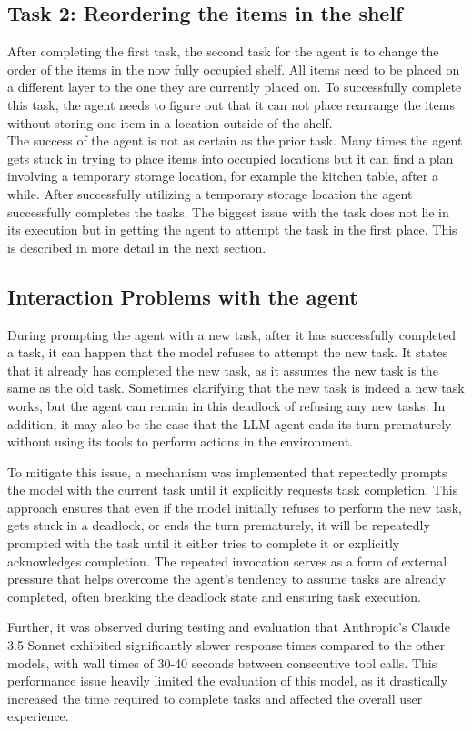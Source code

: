 \documentclass[../report.tex]{subfiles}
\begin{document}
\subsection{Task 2: Reordering the items in the shelf}
After completing the first task, the second task for the agent is to change the order of the items in the now fully occupied shelf. All items need to be placed on a different layer to the one they are currently placed on. To successfully complete this task, the agent needs to figure out that it can not place rearrange the items without storing one item in a location outside of the shelf. \\
The success of the agent is not as certain as the prior task. Many times the agent gets stuck in trying to place items into occupied locations but it can find a plan involving a temporary storage location, for example the kitchen table, after a while. After successfully utilizing a temporary storage location the agent successfully completes the tasks. The biggest issue with the task does not lie in its execution but in getting the agent to attempt the task in the first place. This is described in more detail in the next section.

\subsection{Interaction Problems with the agent}
During prompting the agent with a new task, after it has successfully completed a task, it can happen that the model refuses to attempt the new task. It states that it already has completed the new task, as it assumes the new task is the same as the old task. Sometimes clarifying that the new task is indeed a new task works, but the agent can remain in this deadlock of refusing any new tasks. In addition, it may also be the case that the LLM agent ends its turn prematurely without using its tools to perform actions in the environment.

To mitigate this issue, a mechanism was implemented that repeatedly prompts the model with the current task until it explicitly requests task completion. This approach ensures that even if the model initially refuses to perform the new task, gets stuck in a deadlock, or ends the turn prematurely, it will be repeatedly prompted with the task until it either tries to complete it or explicitly acknowledges completion. The repeated invocation serves as a form of external pressure that helps overcome the agent's tendency to assume tasks are already completed, often breaking the deadlock state and ensuring task execution.

Further, it was observed during testing and evaluation that Anthropic's Claude 3.5 Sonnet exhibited significantly slower response times compared to the other models, with wall times of 30-40 seconds between consecutive tool calls. This performance issue heavily limited the evaluation of this model, as it drastically increased the time required to complete tasks and affected the overall user experience.
\end{document}
